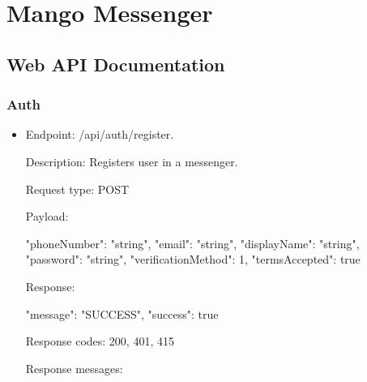 \chapter{Mango Messenger}\label{ch:mango-messenger}


\section{Web API Documentation}\label{sec:web-api-documentation}

\subsection{Auth}\label{subsec:auth}
\begin{itemize}
    \item Endpoint: /api/auth/register.

    Description: Registers user in a messenger.

    Request type: POST

    Payload:

    \begin{spverbatim}
    {
        "phoneNumber": "string",
        "email": "string",
        "displayName": "string",
        "password": "string",
        "verificationMethod": 1,
        "termsAccepted": true
    }
    \end{spverbatim}

    Response:

    \begin{spverbatim}
    {
        "message": "SUCCESS",
        "success": true
    }
    \end{spverbatim}

    Response codes: 200, 401, 415

    Response messages:

\end{itemize}